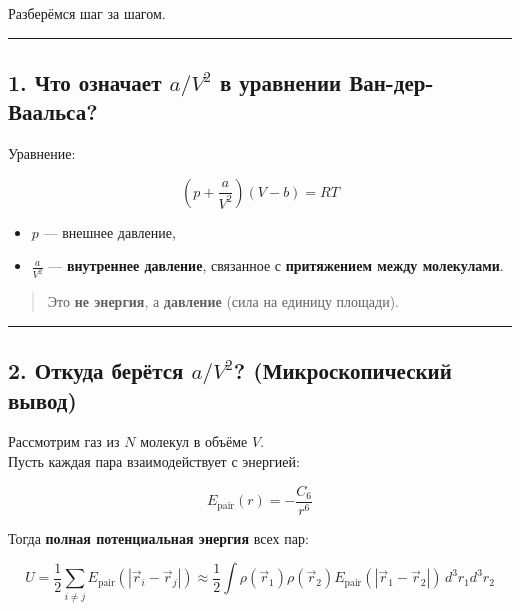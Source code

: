 \documentclass[11pt]{article}
\providecommand{\tightlist}{%
      \setlength{\itemsep}{0pt}\setlength{\parskip}{0pt}}
\begin{document}
Разберёмся шаг за шагом.

\begin{center}\rule{0.5\linewidth}{\linethickness}\end{center}

\subsection{\texorpdfstring{1. Что означает \(a/V^2\) в уравнении
Ван-дер-Ваальса?}{1. Что означает a/V\^{}2 в уравнении Ван-дер-Ваальса?}}\label{ux447ux442ux43e-ux43eux437ux43dux430ux447ux430ux435ux442-av2-ux432-ux443ux440ux430ux432ux43dux435ux43dux438ux438-ux432ux430ux43d-ux434ux435ux440-ux432ux430ux430ux43bux44cux441ux430}

Уравнение:

\[
\left( p + \frac{a}{V^2} \right) (V - b) = RT
\]

\begin{itemize}
\tightlist
\item
  \(p\) --- внешнее давление,
\item
  \(\frac{a}{V^2}\) --- \textbf{внутреннее давление}, связанное с
  \textbf{притяжением между молекулами}.
\end{itemize}

\begin{quote}
Это \textbf{не энергия}, а \textbf{давление} (сила на единицу площади).
\end{quote}

\begin{center}\rule{0.5\linewidth}{\linethickness}\end{center}

\subsection{\texorpdfstring{2. Откуда берётся \(a/V^2\)?
(Микроскопический
вывод)}{2. Откуда берётся a/V\^{}2? (Микроскопический вывод)}}\label{ux43eux442ux43aux443ux434ux430-ux431ux435ux440ux451ux442ux441ux44f-av2-ux43cux438ux43aux440ux43eux441ux43aux43eux43fux438ux447ux435ux441ux43aux438ux439-ux432ux44bux432ux43eux434}

Рассмотрим газ из \(N\) молекул в объёме \(V\).\\
Пусть каждая пара взаимодействует с энергией:

\[
E_{\text{pair}}(r) = -\frac{C_6}{r^6}
\]

Тогда \textbf{полная потенциальная энергия} всех пар:

\[
U = \frac{1}{2} \sum_{i \neq j} E_{\text{pair}}(|\vec{r}_i - \vec{r}_j|) \approx \frac{1}{2} \int \rho(\vec{r}_1) \rho(\vec{r}_2) E_{\text{pair}}(|\vec{r}_1 - \vec{r}_2|)\, d^3r_1 d^3r_2
\]
\end{document}
